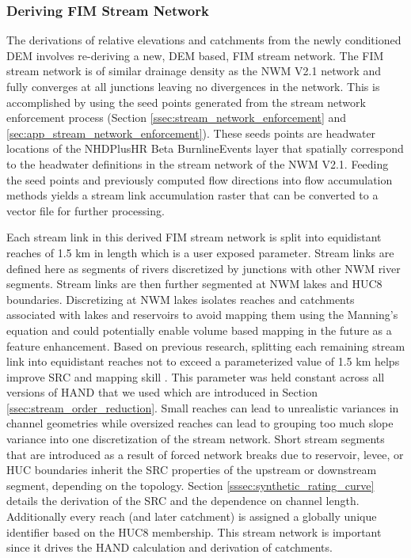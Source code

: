 \subsubsection{Deriving FIM Stream Network}
\label{sssec:deriving_fim_stream_network}
%
The derivations of relative elevations and catchments from the newly conditioned DEM involves re-deriving a new, DEM based, FIM stream network. 
The FIM stream network is of similar drainage density as the NWM V2.1 network and fully converges at all junctions leaving no divergences in the network.
This is accomplished by using the seed points generated from the stream network enforcement process (Section \ref{ssec:stream_network_enforcement} and \ref{sec:app_stream_network_enforcement}).
These seeds points are headwater locations of the NHDPlusHR Beta BurnlineEvents layer that spatially correspond to the headwater definitions in the stream network of the NWM V2.1.
Feeding the seed points and previously computed flow directions into flow accumulation methods \cite{wallis2009parallel,tarboton1997new,tarboton2005terrain} yields a stream link accumulation raster that can be converted to a vector file for further processing.

Each stream link in this derived FIM stream network is split into equidistant reaches of 1.5 km in length which is a user exposed parameter.
Stream links are defined here as segments of rivers discretized by junctions with other NWM river segments.
Stream links are then further segmented at NWM lakes and HUC8 boundaries.
Discretizing at NWM lakes isolates reaches and catchments associated with lakes and reservoirs to avoid mapping them using the Manning's equation and could potentially enable volume based mapping in the future as a feature enhancement.
Based on previous research, splitting each remaining stream link into equidistant reaches not to exceed a parameterized value of 1.5 km helps improve SRC and mapping skill \cite{garousi2019terrain,godbout2019error,zheng2018geoflood}.
This parameter was held constant across all versions of HAND that we used which are introduced in Section \ref{ssec:stream_order_reduction}.
Small reaches can lead to unrealistic variances in channel geometries while oversized reaches can lead to grouping too much slope variance into one discretization of the stream network.
Short stream segments that are introduced as a result of forced network breaks due to reservoir, levee, or HUC boundaries inherit the SRC properties of the upstream or downstream segment, depending on the topology.
Section \ref{sssec:synthetic_rating_curve} details the derivation of the SRC and the dependence on channel length. 
Additionally every reach (and later catchment) is assigned a globally unique identifier based on the HUC8 membership.
This stream network is important since it drives the HAND calculation and derivation of catchments.
%
